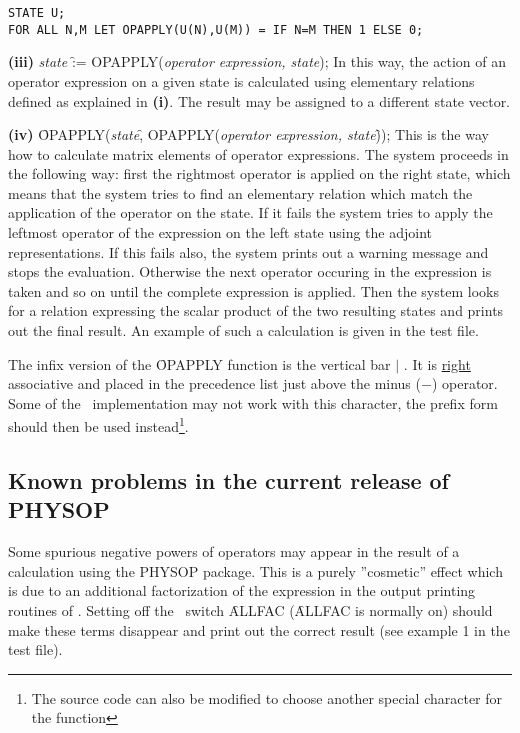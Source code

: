 \begin{verbatim}
STATE U;
FOR ALL N,M LET OPAPPLY(U(N),U(M)) = IF N=M THEN 1 ELSE 0;
\end{verbatim}

{\bf (iii)} {\it state} \f{:= OPAPPLY(}{\it operator expression, state});
 In this way, the action of an operator expression on a given state
is calculated using elementary relations defined as explained in {\bf
(i)}. The result may be assigned to a different state vector.

{\bf (iv)} \f{OPAPPLY(}{\it state}\f{, OPAPPLY(}{\it operator expression,
state}\f{))}; This is the way how to calculate matrix elements of
operator
expressions. The system proceeds in the following way: first the
rightmost operator is applied on the right state, which means that the
system tries
to find an elementary relation which match the application of the
operator on the state. If it fails
the system tries to apply the leftmost operator of the expression on the
left state using the adjoint representations. If this fails also,
the system prints out a warning message and stops the evaluation.
Otherwise the next operator occuring in the expression is
taken and so on until the complete expression is applied.  Then the
system
looks for a relation expressing the scalar product of the two
resulting states and prints out the final result. An example of such
a calculation is given in the test file.

The infix version of the \f{OPAPPLY} function is the vertical bar $\mid$
. It is \underline{right} associative and placed in the precedence
list just above the minus ($-$) operator.
Some of the \REDUCE\ implementation may not work with this character,
the prefix form should then be used instead\footnote{The source code
can also be modified to choose another special character for the
function}.

\subsection{Known problems in the current release of PHYSOP}

 Some spurious negative powers  of operators
may appear
in the result of a calculation using the PHYSOP package. This is a
purely ''cosmetic'' effect which is due to an additional
factorization of the expression in the output printing routines of
\REDUCE. Setting off the \REDUCE\ switch \f{ALLFAC}  (\f{ALLFAC} is normally
on)
should make these
terms disappear and print out the correct result (see example 1
in the test file).


